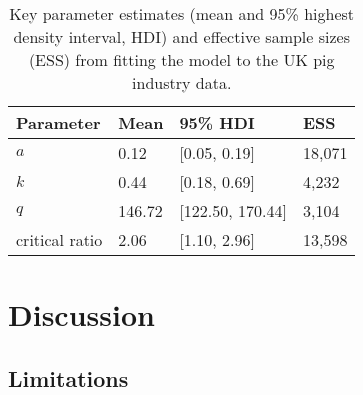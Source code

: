 \documentclass[12pt]{article}
\begin{document}
\begin{table}[t!]
  \centering
  \footnotesize
  \begin{tabular}{p{5cm}p{2cm}p{3cm}p{2cm}}
    \textbf{Parameter} & \textbf{Mean} & \textbf{95\% HDI} & \textbf{ESS} \\ \hline
    $a$ & 0.12 & [0.05, 0.19] & 18,071 \\
    $k$ & 0.44 & [0.18, 0.69] & 4,232 \\
    $q$ & 146.72 & [122.50, 170.44] & 3,104 \\
    critical ratio & 2.06 & [1.10, 2.96] & 13,598 \\
  \end{tabular}
  \caption{Key parameter estimates (mean and 95\% highest density interval, HDI) and effective sample sizes (ESS) from fitting the model to the UK pig industry data.}
  \label{table_parameter_estimates}
\end{table}

\section{Discussion}

\subsection{Limitations}


\newpage
\printbibliography
\end{document}
